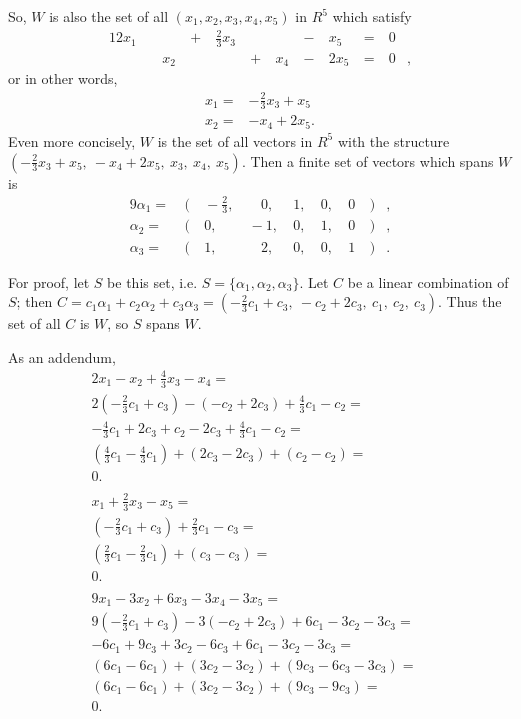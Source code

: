\documentclass[12pt]{article}
\begin{document}
\begin{enumerate}
      So, $W$ is also the set of all $(x_1,x_2,x_3,x_4,x_5)$ in $R^5$ which satisfy
      \begin{alignat*}{12}
         x_1&   \ &     \ & +\ & \frac{2}{3}x_3\ &  \ &     \ & -\ &  x_5\ & =\ & 0&\\
            &   \ &  x_2\ &  \ &               \ & +\ &  x_4\ & -\ & 2x_5\ & =\ & 0&,
      \end{alignat*}
      or in other words,
      \begin{align*}
        x_1 =& -\frac{2}{3}x_3 + x_5\\
        x_2 =& -x_4 + 2x_5.
      \end{align*}
      Even more concisely, $W$ is the set of all vectors in $R^5$ with the structure
      $(-\frac{2}{3}x_3 + x_5,\ -x_4 + 2x_5,\ x_3,\ x_4,\ x_5)$. Then a finite set of
      vectors which spans $W$ is
      \begin{alignat*}{9}
        \alpha_1 =&\ (&\ -\frac{2}{3},&\ \ \ \ \ 0,&\ 1,&\ 0,&\ 0&\ )&,\\
        \alpha_2 =&\ (&\            0,&\ -1,&\ 0,&\ 1,&\ 0&\ )&,\\
        \alpha_3 =&\ (&\            1,&\ \ \ \ \ 2,&\ 0,&\ 0,&\ 1&\ )&.
      \end{alignat*}

      For proof, let $S$ be this set, i.e. $S = \{ \alpha_1, \alpha_2, \alpha_3 \}$.
      Let $C$ be a linear combination of $S$; then $C = c_1\alpha_1 + c_2\alpha_2 +
      c_3\alpha_3 = (-\frac{2}{3}c_1 + c_3,\ -c_2 + 2c_3,\ c_1,\ c_2,\ c_3)$. Thus
      the set of all $C$ is $W$, so $S$ spans $W$.

      As an addendum,
      \begin{align*}
        2x_1 - x_2 + \frac{4}{3}x_3 - x_4 =&\\
        2(-\frac{2}{3}c_1 + c_3) - (-c_2 + 2c_3) + \frac{4}{3}c_1 - c_2 =&\\
        -\frac{4}{3}c_1 + 2c_3 + c_2 - 2c_3 + \frac{4}{3}c_1 - c_2 =&\\
        (\frac{4}{3}c_1 - \frac{4}{3}c_1) + (2c_3 - 2c_3) + (c_2 - c_2) =&\\
        0.\ \ \ &\\\\
        x_1 + \frac{2}{3}x_3 - x_5 =&\\
        (-\frac{2}{3}c_1 + c_3) + \frac{2}{3}c_1 - c_3 =&\\
        (\frac{2}{3}c_1 - \frac{2}{3}c_1) + (c_3 - c_3) =&\\
        0.\ \ \ &\\\\
        9x_1 - 3x_2 + 6x_3 - 3x_4 - 3x_5 =&\\
        9(-\frac{2}{3}c_1 + c_3) - 3(-c_2 + 2c_3) + 6c_1 - 3c_2 - 3c_3 =&\\
        -6c_1 + 9c_3 + 3c_2 - 6c_3 + 6c_1 - 3c_2 - 3c_3 =&\\
        (6c_1 - 6c_1) + (3c_2 - 3c_2) + (9c_3 - 6c_3 - 3c_3) =&\\
        (6c_1 - 6c_1) + (3c_2 - 3c_2) + (9c_3 - 9c_3) =&\\
        0.\ \ \ &
      \end{align*}


\end{enumerate}
\end{document}
